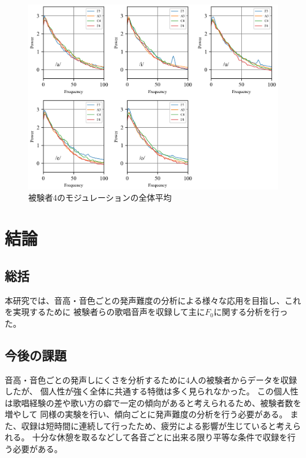 \documentclass[10.5ptj,a4j,dvipdfmx,uplatex, oneside, openany, report, draft]{jsbook}%
\begin{document}
\begin{figure}[htbp]
    \begin{center}
      \includegraphics[clip,width=12.0cm]{long_spectrogram_4.png}
      \caption{被験者4のモジュレーションの全体平均}
      \label{long_spectrogram_4}
    \end{center}
\end{figure}




\chapter{結論}
\section{総括}
本研究では、音高・音色ごとの発声難度の分析による様々な応用を目指し、これを実現するために
被験者らの歌唱音声を収録して主に$F_0$に関する分析を行った。

\section{今後の課題}

音高・音色ごとの発声しにくさを分析するために4人の被験者からデータを収録したが、
個人性が強く全体に共通する特徴は多く見られなかった。
この個人性は歌唱経験の差や歌い方の癖で一定の傾向があると考えられるため、被験者数を増やして
同様の実験を行い、傾向ごとに発声難度の分析を行う必要がある。
また、収録は短時間に連続して行ったため、疲労による影響が生じていると考えられる。
十分な休憩を取るなどして各音ごとに出来る限り平等な条件で収録を行う必要がある。
\end{document}
